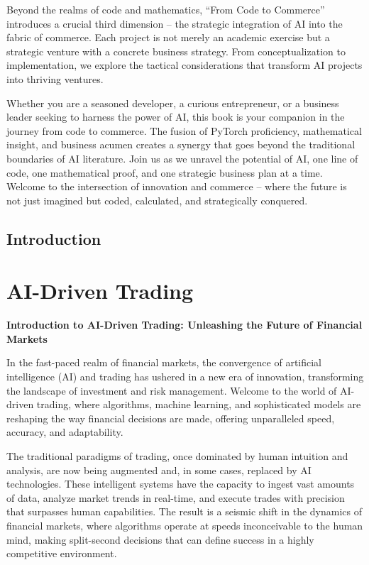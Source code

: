 \documentclass[
  letterpaper,
  DIV=11,
  numbers=noendperiod]{scrreprt}
\begin{document}
Beyond the realms of code and mathematics, ``From Code to Commerce''
introduces a crucial third dimension -- the strategic integration of AI
into the fabric of commerce. Each project is not merely an academic
exercise but a strategic venture with a concrete business strategy. From
conceptualization to implementation, we explore the tactical
considerations that transform AI projects into thriving ventures.

Whether you are a seasoned developer, a curious entrepreneur, or a
business leader seeking to harness the power of AI, this book is your
companion in the journey from code to commerce. The fusion of PyTorch
proficiency, mathematical insight, and business acumen creates a synergy
that goes beyond the traditional boundaries of AI literature. Join us as
we unravel the potential of AI, one line of code, one mathematical
proof, and one strategic business plan at a time. Welcome to the
intersection of innovation and commerce -- where the future is not just
imagined but coded, calculated, and strategically conquered.


\chapter*{Introduction}\label{introduction}


\part{AI-Driven Trading}

\textbf{Introduction to AI-Driven Trading: Unleashing the Future of
Financial Markets}

In the fast-paced realm of financial markets, the convergence of
artificial intelligence (AI) and trading has ushered in a new era of
innovation, transforming the landscape of investment and risk
management. Welcome to the world of AI-driven trading, where algorithms,
machine learning, and sophisticated models are reshaping the way
financial decisions are made, offering unparalleled speed, accuracy, and
adaptability.

The traditional paradigms of trading, once dominated by human intuition
and analysis, are now being augmented and, in some cases, replaced by AI
technologies. These intelligent systems have the capacity to ingest vast
amounts of data, analyze market trends in real-time, and execute trades
with precision that surpasses human capabilities. The result is a
seismic shift in the dynamics of financial markets, where algorithms
operate at speeds inconceivable to the human mind, making split-second
decisions that can define success in a highly competitive environment.
\end{document}
